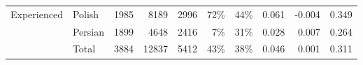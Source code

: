 \begin{table}
\begin{tabular}{llrrrr|rrrr}
\cline{1-10}
\multirow{3}{*}{Experienced} & Polish &                  1985 &                       8189 &                  2996 &                    72\% &                                                44\% &                 0.061 &                          -0.004 &       0.349 \\
            & Persian &                  1899 &                       4648 &                  2416 &                     7\% &                                                31\% &                 0.028 &                           0.007 &       0.264 \\
            & Total &                  3884 &                      12837 &                  5412 &                    43\% &                                                38\% &                 0.046 &                           0.001 &       0.311 \\
\bottomrule

\end{tabular}
\label{table:participants}
\end{table}

